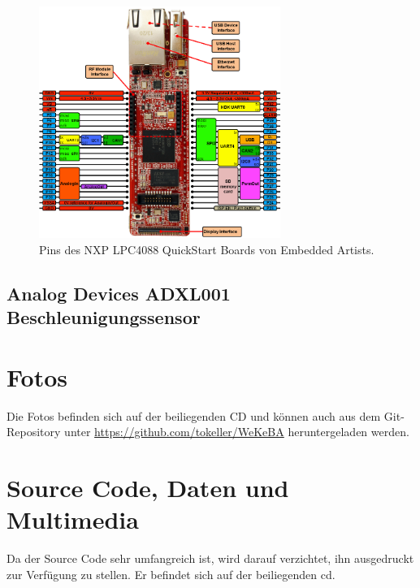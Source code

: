 \begin{figure}
	\centering		\includegraphics[width=0.7\textwidth]{images/datasheets/LPC4088_QSB_pinning_revA_800x769.png}
	\caption{Pins des NXP LPC4088 QuickStart Boards von Embedded Artists.}
	\label{fig.NXP_LPC4088_QSB_pinout}
\end{figure}



\subsection{Analog Devices ADXL001 Beschleunigungssensor}



\section{Fotos}\label{sec.foto.testaufbau}
Die Fotos befinden sich auf der beiliegenden CD und können auch aus dem Git-Repository unter \url{https://github.com/tokeller/WeKeBA} heruntergeladen werden.

\section{Source Code, Daten und Multimedia}\label{app.cd}
Da der Source Code sehr umfangreich ist, wird darauf verzichtet, ihn ausgedruckt zur Verfügung zu stellen. Er befindet sich auf der beiliegenden \gls{cd}.


